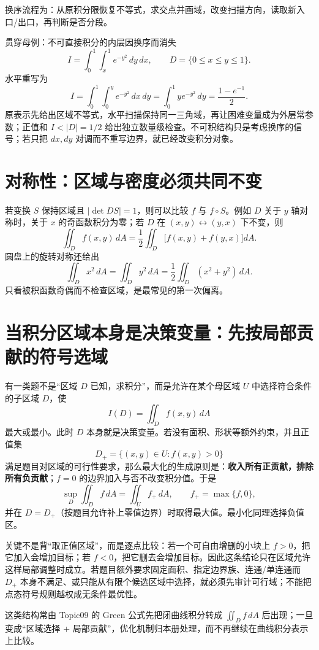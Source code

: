 \documentclass[11pt,a4paper,fontset=fandol]{ctexart}
\begin{document}
换序流程为：从原积分限恢复不等式，求交点并画域，改变扫描方向，读取新入口/出口，再判断是否分段。

\begin{examplebox}{贯穿母例：不可直接积分的内层因换序而消失}
\[
I=\int_0^1\int_x^1e^{-y^2}\,dy\,dx,
\qquad D=\{0\le x\le y\le1\}.
\]
水平重写为
\[
I=\int_0^1\int_0^y e^{-y^2}\,dx\,dy
=\int_0^1ye^{-y^2}\,dy=\frac{1-e^{-1}}2.
\]
原表示先给出区域不等式，水平扫描保持同一三角域，再让困难变量成为外层常参数；正值和 $I<\lvert D\rvert=1/2$ 给出独立数量级检查。不可积结构只是考虑换序的信号；若只把 $dx,dy$ 对调而不重写边界，就已经改变积分对象。
\end{examplebox}

\section{对称性：区域与密度必须共同不变}

若变换 $S$ 保持区域且 $\lvert\det DS\rvert=1$，则可以比较 $f$ 与 $f\circ S$。例如 $D$ 关于 $y$ 轴对称时，关于 $x$ 的奇函数积分为零；若 $D$ 在 $(x,y)\leftrightarrow(y,x)$ 下不变，则
\[
\iint_D f(x,y)\,dA
=\frac12\iint_D\bigl[f(x,y)+f(y,x)\bigr]dA.
\]
圆盘上的旋转对称还给出
\[
\iint_D x^2\,dA=\iint_D y^2\,dA
=\frac12\iint_D(x^2+y^2)\,dA.
\]
只看被积函数奇偶而不检查区域，是最常见的第一次偏离。

\section{当积分区域本身是决策变量：先按局部贡献的符号选域}

有一类题不是“区域 $D$ 已知，求积分”，而是允许在某个母区域 $U$ 中选择符合条件的子区域 $D$，使
\[
I(D)=\iint_D f(x,y)\,dA
\]
最大或最小。此时 $D$ 本身就是决策变量。若没有面积、形状等额外约束，并且正值集
\[
D_+=\{(x,y)\in U:f(x,y)>0\}
\]
满足题目对区域的可行性要求，那么最大化的生成原则是：\textbf{收入所有正贡献，排除所有负贡献}；$f=0$ 的边界加入与否不改变积分值。于是
\[
\boxed{\sup_D\iint_D f\,dA=\iint_U f_+\,dA,
\qquad f_+=\max\{f,0\},}
\]
并在 $D=D_+$（按题目允许补上零值边界）时取得最大值。最小化同理选择负值区。

关键不是背“取正值区域”，而是逐点比较：若一个可自由增删的小块上 $f>0$，把它加入会增加目标；若 $f<0$，把它删去会增加目标。因此这条结论只在区域允许这样局部调整时成立。若题目额外要求固定面积、指定边界族、连通/单连通而 $D_+$ 本身不满足、或只能从有限个候选区域中选择，就必须先审计可行域；不能把点态符号规则越权成无条件最优性。

这类结构常由 Topic09 的 Green 公式先把闭曲线积分转成 $\iint_D f\,dA$ 后出现；一旦变成“区域选择 + 局部贡献”，优化机制归本册处理，而不再继续在曲线积分表示上比较。
\end{document}
